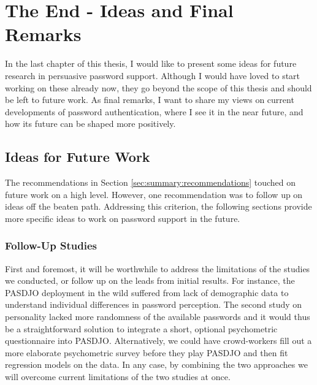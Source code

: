 \chapter[The End - Ideas and Final Remarks]{The End - Ideas and Final Remarks}\label{chap:the_end}
In the last chapter of this thesis, I would like to present some ideas for future research in persuasive password support. Although I would have loved to start working on these already now, they go beyond the scope of this thesis and should be left to future work. As final remarks, I want to share my views on current developments of password authentication, where I see it in the near future, and how its future can be shaped more positively. 

\section{Ideas for Future Work}
The recommendations in Section \ref{sec:summary:recommendations} touched on future work on a high level. However, one recommendation was to follow up on ideas off the beaten path. Addressing this criterion, the following sections provide more specific ideas to work on password support in the future. 


\subsection{Follow-Up Studies} 
First and foremost, it will be worthwhile to address the limitations of the studies we conducted, or follow up on the leads from initial results. For instance, the PASDJO deployment in the wild suffered from lack of demographic data to understand individual differences in password perception. The second study on personality lacked more randomness of the available passwords and it would thus be a straightforward solution to integrate a short, optional psychometric questionnaire into PASDJO. Alternatively, we could have crowd-workers fill out a more elaborate psychometric survey before they play PASDJO and then fit regression models on the data. In any case, by combining the two approaches we will overcome current limitations of the two studies at once. 


